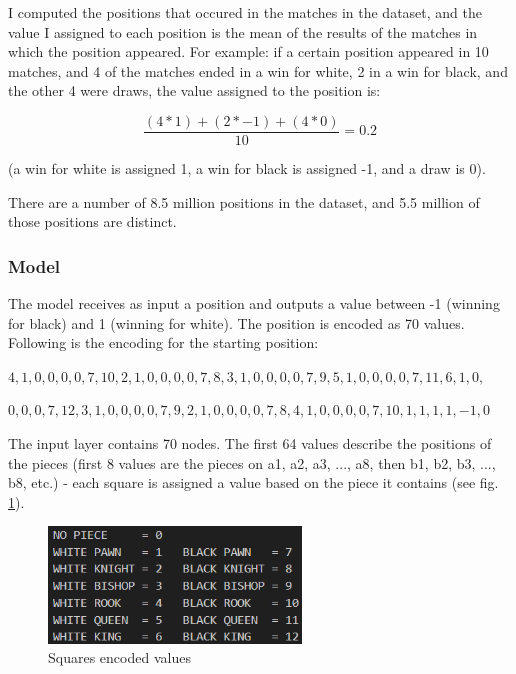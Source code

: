 I computed the positions that occured in the matches in the dataset, and the value I assigned to each position is the mean of the results of the matches in which the position appeared. For example: if a certain position appeared in 10 matches, and 4 of the matches ended in a win for white, 2 in a win for black, and the other 4 were draws, the value assigned to the position is:

\begin{equation}    
    \frac{(4*1)+(2*-1)+(4*0)}{10}=0.2
\end{equation}

(a win for white is assigned 1, a win for black is assigned -1, and a draw is 0).


There are a number of 8.5 million positions in the dataset, and 5.5 million of those positions are distinct.

\subsubsection{Model}
\label{subsec:ch4sec3subsec2subsubsec2}

The model receives as input a position and outputs a value between -1 (winning for black) and 1 (winning for white). The position is encoded as 70 values. Following is the encoding for the starting position:

$4,1,0,0,0,0,7,10,2,1,0,0,0,0,7,8,3,1,0,0,0,0,7,9,5,1,0,0,0,0,7,11,6,1,0,$

$0,0,0,7,12,3,1,0,0,0,0,7,9,2,1,0,0,0,0,7,8,4,1,0,0,0,0,7,10,1,1,1,1,-1,0$

The input layer contains 70 nodes. The first 64 values describe the positions of the pieces (first 8 values are the pieces on a1, a2, a3, ..., a8, then b1, b2, b3, ..., b8, etc.) - each square is assigned a value based on the piece it contains (see fig. \ref{fig:squaresEncodedValues}).

\begin{figure}[h]
    \centering
    \includegraphics[width=0.6\textwidth]{figures/squares-encoded-values.png}
    \caption{Squares encoded values}
    \label{fig:squaresEncodedValues}
\end{figure}

